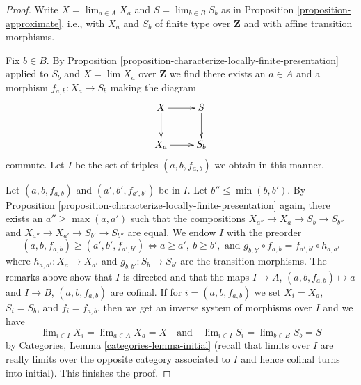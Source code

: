 \documentclass[10pt,a4paper]{amsart}
\theoremstyle{plain}
\theoremstyle{definition}
\theoremstyle{remark}
\numberwithin{equation}{subsection}
\def\lim{\mathop{\mathrm{lim}}\nolimits}
\begin{document}
\begin{proof}
Write $X = \lim_{a \in A} X_a$ and $S = \lim_{b \in B} S_b$ as in
Proposition \ref{proposition-approximate}, i.e., with $X_a$ and $S_b$
of finite type over $\mathbf{Z}$ and with affine transition morphisms.

\medskip\noindent
Fix $b \in B$.
By Proposition \ref{proposition-characterize-locally-finite-presentation}
applied to $S_b$ and $X = \lim X_a$ over $\mathbf{Z}$
we find there exists an $a \in A$ and a morphism
$f_{a, b} : X_a \to S_b$ making the diagram
$$
\xymatrix{
X \ar[d] \ar[r] & S \ar[d] \\
X_a \ar[r] & S_b
}
$$
commute. Let $I$ be the set of triples $(a, b, f_{a, b})$ we
obtain in this manner.

\medskip\noindent
Let $(a, b, f_{a, b})$ and $(a', b', f_{a', b'})$ be in $I$.
Let $b'' \leq \min(b, b')$. By
Proposition \ref{proposition-characterize-locally-finite-presentation}
again, there exists an $a'' \geq \max(a, a')$ such that
the compositions $X_{a''} \to X_a \to S_b \to S_{b''}$ and
$X_{a''} \to X_{a'} \to S_{b'} \to S_{b''}$ are equal.
We endow $I$ with the preorder
$$
(a, b, f_{a, b}) \geq (a', b', f_{a', b'})
\Leftrightarrow
a \geq a',\ b \geq b',\text{ and }
g_{b, b'} \circ f_{a, b} = f_{a', b'} \circ h_{a, a'}
$$
where $h_{a, a'} : X_a \to X_{a'}$ and $g_{b, b'} : S_b \to S_{b'}$
are the transition morphisms. The remarks above show that $I$
is directed and that the maps $I \to A$, $(a, b, f_{a, b}) \mapsto a$
and $I \to B$, $(a, b, f_{a, b})$ are cofinal. If for $i = (a, b, f_{a, b})$
we set $X_i = X_a$, $S_i = S_b$, and $f_i = f_{a, b}$, then we get
an inverse system of morphisms over $I$ and we have
$$
\lim_{i \in I} X_i = \lim_{a \in A} X_a = X
\quad\text{and}\quad
\lim_{i \in I} S_i = \lim_{b \in B} S_b = S
$$
by Categories, Lemma \ref{categories-lemma-initial} (recall that
limits over $I$ are really limits over the opposite category
associated to $I$ and hence cofinal turns into initial).
This finishes the proof.
\end{proof}
\end{document}
